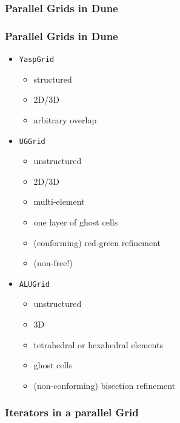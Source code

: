 \subsubsection{Parallel Grids in Dune}

\begin{frame}
  \frametitle<presentation>{Parallel Grids in Dune}
  \begin{itemize}
  \item<1-> \lstinline[basicstyle=\normalfont\ttfamily]!YaspGrid!
      \begin{itemize}
      \item structured
      \item 2D/3D
      \item arbitrary overlap
      \end{itemize}
  \item<2-> \lstinline[basicstyle=\normalfont\ttfamily]!UGGrid!
      \begin{itemize}
      \item unstructured
      \item 2D/3D
      \item multi-element
      \item one layer of ghost cells
      \item (conforming) red-green refinement
      \item (non-free!)
      \end{itemize}
  \item<3-> \lstinline[basicstyle=\normalfont\ttfamily]!ALUGrid!
      \begin{itemize}
      \item unstructured
      \item 3D
      \item tetrahedral or hexahedral elements
      \item ghost cells
      \item (non-conforming) bisection refinement
      \end{itemize}
  \end{itemize}
\end{frame}

\subsubsection{Iterators in a parallel Grid}

